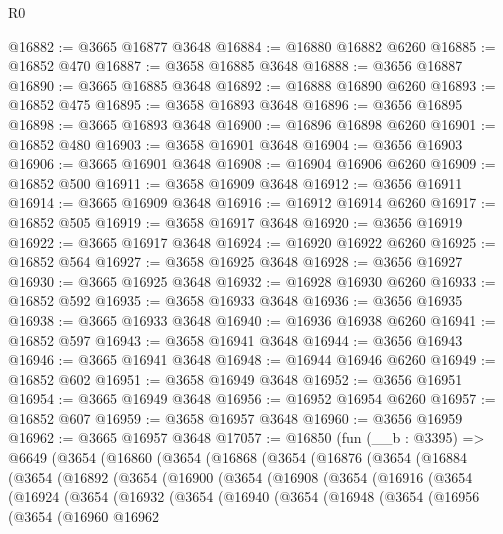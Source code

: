 \begin{lexlean}{R0}
\begin{coremodule}
@16882 := @3665 @16877 @3648
@16884 := @16880 @16882 @6260
@16885 := @16852 @470
@16887 := @3658 @16885 @3648
@16888 := @3656 @16887
@16890 := @3665 @16885 @3648
@16892 := @16888 @16890 @6260
@16893 := @16852 @475
@16895 := @3658 @16893 @3648
@16896 := @3656 @16895
@16898 := @3665 @16893 @3648
@16900 := @16896 @16898 @6260
@16901 := @16852 @480
@16903 := @3658 @16901 @3648
@16904 := @3656 @16903
@16906 := @3665 @16901 @3648
@16908 := @16904 @16906 @6260
@16909 := @16852 @500
@16911 := @3658 @16909 @3648
@16912 := @3656 @16911
@16914 := @3665 @16909 @3648
@16916 := @16912 @16914 @6260
@16917 := @16852 @505
@16919 := @3658 @16917 @3648
@16920 := @3656 @16919
@16922 := @3665 @16917 @3648
@16924 := @16920 @16922 @6260
@16925 := @16852 @564
@16927 := @3658 @16925 @3648
@16928 := @3656 @16927
@16930 := @3665 @16925 @3648
@16932 := @16928 @16930 @6260
@16933 := @16852 @592
@16935 := @3658 @16933 @3648
@16936 := @3656 @16935
@16938 := @3665 @16933 @3648
@16940 := @16936 @16938 @6260
@16941 := @16852 @597
@16943 := @3658 @16941 @3648
@16944 := @3656 @16943
@16946 := @3665 @16941 @3648
@16948 := @16944 @16946 @6260
@16949 := @16852 @602
@16951 := @3658 @16949 @3648
@16952 := @3656 @16951
@16954 := @3665 @16949 @3648
@16956 := @16952 @16954 @6260
@16957 := @16852 @607
@16959 := @3658 @16957 @3648
@16960 := @3656 @16959
@16962 := @3665 @16957 @3648
@17057 := @16850
    (fun (__b : @3395) =>
    @6649
      (@3654
        (@16860
          (@3654
            (@16868
              (@3654
                (@16876
                  (@3654
                    (@16884
                      (@3654
                        (@16892
                          (@3654
                            (@16900
                              (@3654
                                (@16908
                                  (@3654
                                    (@16916
                                      (@3654
                                        (@16924
                                          (@3654
                                            (@16932
                                              (@3654
                                                (@16940
                                                  (@3654
                                                    (@16948
                                                      (@3654
                                                        (@16956
                                                          (@3654
                                                            (@16960
                                                              @16962

\end{coremodule}
\end{lexlean}
